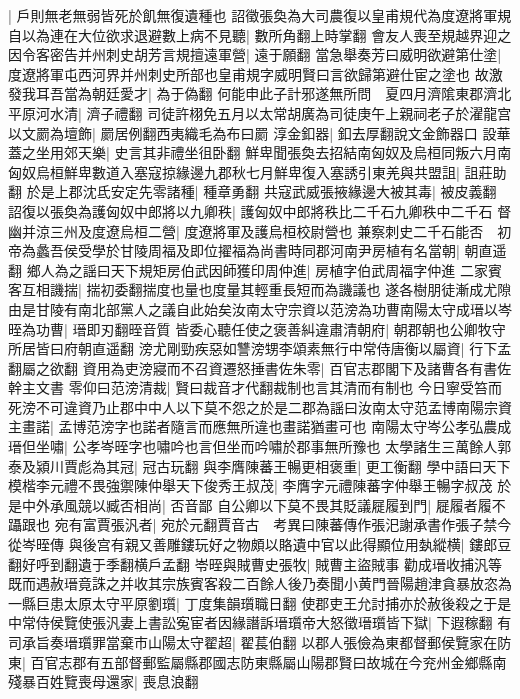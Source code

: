 |{
	戶則無老無弱皆死於飢無復遺種也}
詔徵張奐為大司農復以皇甫規代為度遼將軍規自以為連在大位欲求退避數上病不見聽|{
	數所角翻上時掌翻}
會友人喪至規越界迎之因令客密告并州刺史胡芳言規擅遠軍營|{
	遠于願翻}
當急舉奏芳曰威明欲避第仕塗|{
	度遼將軍屯西河界并州刺史所部也皇甫規字威明賢曰言欲歸第避仕宦之塗也}
故激發我耳吾當為朝廷愛才|{
	為于偽翻}
何能申此子計邪遂無所問　夏四月濟隂東郡濟北平原河水清|{
	濟子禮翻}
司徒許栩免五月以太常胡廣為司徒庚午上親祠老子於濯龍宫以文罽為壇飾|{
	罽居例翻西夷織毛為布曰罽}
淳金釦器|{
	釦去厚翻說文金飾器口}
設華蓋之坐用郊天樂|{
	史言其非禮坐徂卧翻}
鮮卑聞張奐去招結南匈奴及烏桓同叛六月南匈奴烏桓鮮卑數道入塞寇掠緣邊九郡秋七月鮮卑復入塞誘引東羌與共盟詛|{
	詛莊助翻}
於是上郡沈氐安定先零諸種|{
	種章勇翻}
共寇武威張掖緣邊大被其毒|{
	被皮義翻}
詔復以張奐為護匈奴中郎將以九卿秩|{
	護匈奴中郎將秩比二千石九卿秩中二千石}
督幽并涼三州及度遼烏桓二營|{
	度遼將軍及護烏桓校尉營也}
兼察刺史二千石能否　初帝為蠡吾侯受學於甘陵周福及即位擢福為尚書時同郡河南尹房植有名當朝|{
	朝直遥翻}
鄉人為之謡曰天下規矩房伯武因師獲印周仲進|{
	房植字伯武周福字仲進}
二家賓客互相譏揣|{
	揣初委翻揣度也量也度量其輕重長短而為譏議也}
遂各樹朋徒漸成尤隙由是甘陵有南北部黨人之議自此始矣汝南太守宗資以范滂為功曹南陽太守成瑨以岑晊為功曹|{
	瑨即刃翻晊音質}
皆委心聽任使之褒善糾違肅清朝府|{
	朝郡朝也公卿牧守所居皆曰府朝直遥翻}
滂尤剛勁疾惡如讐滂甥李頌素無行中常侍唐衡以屬資|{
	行下孟翻屬之欲翻}
資用為吏滂寢而不召資遷怒捶書佐朱零|{
	百官志郡閣下及諸曹各有書佐幹主文書}
零仰曰范滂清裁|{
	賢曰裁音才代翻裁制也言其清而有制也}
今日寧受笞而死滂不可違資乃止郡中中人以下莫不怨之於是二郡為謡曰汝南太守范孟博南陽宗資主畫諾|{
	孟博范滂字也諾者隨言而應無所違也畫諾猶畫可也}
南陽太守岑公孝弘農成瑨但坐嘯|{
	公孝岑晊字也嘯吟也言但坐而吟嘯於郡事無所豫也}
太學諸生三萬餘人郭泰及潁川賈彪為其冠|{
	冠古玩翻}
與李膺陳蕃王暢更相褒重|{
	更工衡翻}
學中語曰天下模楷李元禮不畏強禦陳仲舉天下俊秀王叔茂|{
	李膺字元禮陳蕃字仲舉王暢字叔茂}
於是中外承風競以臧否相尚|{
	否音鄙}
自公卿以下莫不畏其貶議屣履到門|{
	屣履者履不躡跟也}
宛有富賈張汎者|{
	宛於元翻賈音古　考異曰陳蕃傳作張汜謝承書作張子禁今從岑晊傳}
與後宫有親又善雕鏤玩好之物頗以賂遺中官以此得顯位用埶縱横|{
	鏤郎豆翻好呼到翻遺于季翻横戶孟翻}
岺晊與賊曹史張牧|{
	賊曹主盜賊事}
勸成瑨收捕汎等既而遇赦瑨竟誅之并收其宗族賓客殺二百餘人後乃奏聞小黄門晉陽趙津貪暴放恣為一縣巨患太原太守平原劉瓆|{
	丁度集韻瓆職日翻}
使郡吏王允討捕亦於赦後殺之于是中常侍侯覽使張汎妻上書訟寃宦者因緣譖訴瑨瓆帝大怒徵瑨瓆皆下獄|{
	下遐稼翻}
有司承旨奏瑨瓆罪當棄市山陽太守翟超|{
	翟萇伯翻}
以郡人張儉為東都督郵侯覽家在防東|{
	百官志郡有五部督郵監屬縣郡國志防東縣屬山陽郡賢曰故城在今兖州金鄉縣南}
殘暴百姓覽喪母還家|{
	喪息浪翻}
